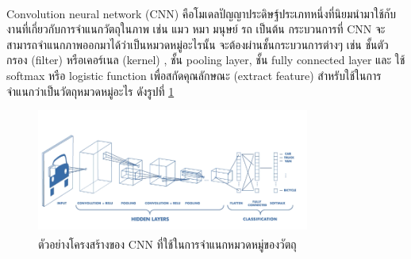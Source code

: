 Convolution neural network (CNN)\textsuperscript{\cite{cnn}} คือโมเดลปัญญาประดิษฐ์ประเภทหนึ่งที่นิยมนำมาใช้กับงานที่เกี่ยวกับการจำแนกวัตถุในภาพ เช่น แมว หมา มนุษย์ รถ เป็นต้น
กระบวนการที่ CNN จะสามารถจำแนกภาพออกมาได้ว่าเป็นหมวดหมู่อะไรนั้น จะต้องผ่านชั้นกระบวนการต่างๆ เช่น ชั้นตัวกรอง (filter) หรือเคอร์เนล (kernel) , ชั้น pooling layer, ชั้น fully connected layer และ ใช้ softmax หรือ logistic function เพื่อสกัดคุณลักษณะ (extract feature) สำหรับใช้ในการจำแนกว่าเป็นวัตถุหมวดหมู่อะไร ดังรูปที่ \ref{fig:CNN architecture}

\begin{figure}[!ht]
	\centering
	\includegraphics[width=0.8\textwidth]{chapter2/images/CNN.png}
		\caption[ตัวอย่างโครงสร้างของ CNN ที่ใช้ในการจำแนกหมวดหมู่ของวัตถุ]{ตัวอย่างโครงสร้างของ CNN ที่ใช้ในการจำแนกหมวดหมู่ของวัตถุ\textsuperscript{\cite{cnn}}}
    	\label{fig:CNN architecture}
\end{figure}

